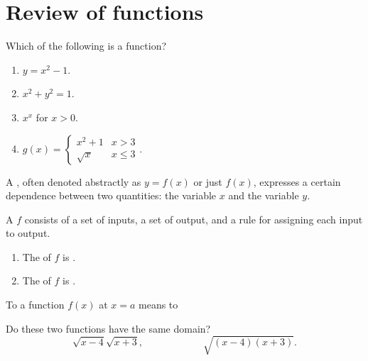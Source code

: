 \documentclass[../main.tex]{subfiles}
\begin{document}
 \section{Review of functions}
\begin{example}
  Which of the following is  a function?

  \begin{multicols}{2}
    \begin{enumerate}[label=(\alph*)]
      \item \(y = x^{2} - 1\).
      \item \(x^{2} + y^{2} = 1\).
      \item \(x^{x}\) for \(x > 0\).
      \item \(g(x) = \begin{cases} x^{2} + 1 & x > 3\\ \sqrt{x} & x \le 3 \end{cases}\).
    \end{enumerate}
  \end{multicols}
\end{example} 


A , often denoted abstractly as \(y = f(x)\) or just \(f(x)\), expresses a certain dependence between two quantities: the \underline{\hspace{1in}} variable \(x\) and the \underline{\hspace{1in}} variable \(y\).

\bigskip
\begin{definition}[function]
  A  \(f\) consists of a set of inputs, a set of output, and a rule for assigning each input to \underline{\hspace{2in}} output.
  \begin{enumerate}
    \item The \underline{\hspace{1in}} of \(f\) is \underline{\hspace{3in}}.
    \item The \underline{\hspace{1in}} of \(f\) is \underline{\hspace{3in}}.
  \end{enumerate}

\end{definition}
To  a function \(f(x)\) at \(x = a\) means to \underline{\hspace{3in}}

\begin{example}
  Do these two functions have the same domain?
  \[
    \sqrt{x - 4}\sqrt{x+3}, \hspace{1in} \sqrt{(x-4)(x+3)}.
  \]

\end{example}
\end{document}
